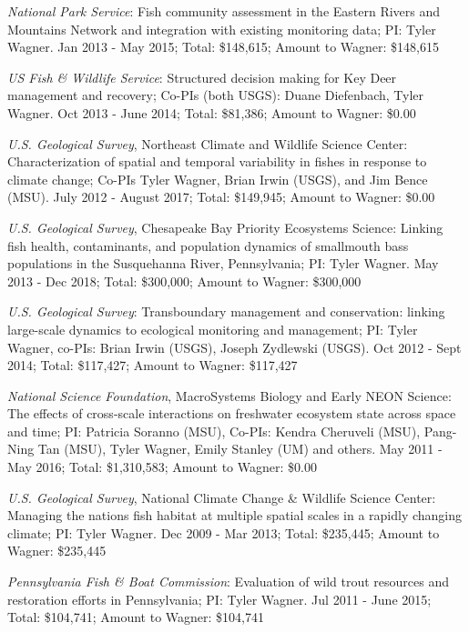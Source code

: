 \documentclass[10pt]{article}
\begin{document}
\begin{flushleft}
\begin{etaremune}
\item {\sl National Park Service}: Fish community assessment in the Eastern Rivers and Mountains Network and integration with existing monitoring data; PI: Tyler Wagner. Jan 2013 - May 2015;  Total: \$148,615; Amount to Wagner: \$148,615

\item {\sl US Fish \& Wildlife Service}: Structured decision making for Key Deer management and recovery; Co-PIs (both USGS): Duane Diefenbach, Tyler Wagner. Oct 2013 - June 2014; Total: \$81,386; Amount to Wagner: \$0.00

\item {\sl U.S. Geological Survey}, Northeast Climate and Wildlife Science Center: Characterization of spatial and temporal variability in fishes in response to climate change; Co-PIs Tyler Wagner, Brian Irwin (USGS), and Jim Bence (MSU). July 2012 - August 2017; Total: \$149,945; Amount to Wagner: \$0.00

\item {\sl  U.S. Geological Survey},  Chesapeake Bay Priority Ecosystems Science: Linking fish health, contaminants, and population dynamics of smallmouth bass populations in the Susquehanna River, Pennsylvania; PI: Tyler Wagner. May 2013 - Dec 2018; Total: \$300,000; Amount to Wagner: \$300,000

\item {\sl  U.S. Geological Survey}: Transboundary management and conservation: linking large-scale dynamics to ecological monitoring and management; PI: Tyler Wagner, co-PIs: Brian Irwin (USGS), Joseph Zydlewski (USGS). Oct 2012 - Sept 2014; Total: \$117,427; Amount to Wagner: \$117,427

\item {\sl National Science Foundation},  MacroSystems Biology and Early NEON Science: The effects of cross-scale interactions on freshwater ecosystem state across space and time; PI: Patricia Soranno (MSU), Co-PIs: Kendra Cheruveli (MSU), Pang-Ning Tan (MSU), Tyler Wagner, Emily Stanley (UM) and others. May 2011 - May 2016; Total: \$1,310,583;  Amount to Wagner: \$0.00

\item {\sl U.S. Geological Survey}, National Climate Change \& Wildlife Science Center: Managing the nations fish habitat at multiple spatial scales in a rapidly changing climate; PI: Tyler Wagner. Dec 2009 - Mar 2013; Total: \$235,445; Amount to Wagner: \$235,445

\item {\sl  Pennsylvania Fish \& Boat Commission}: Evaluation of wild trout resources and restoration efforts in Pennsylvania; PI: Tyler Wagner. Jul 2011 - June 2015; Total: \$104,741; Amount to Wagner: \$104,741


\end{etaremune}
\end{flushleft}
\end{document}
